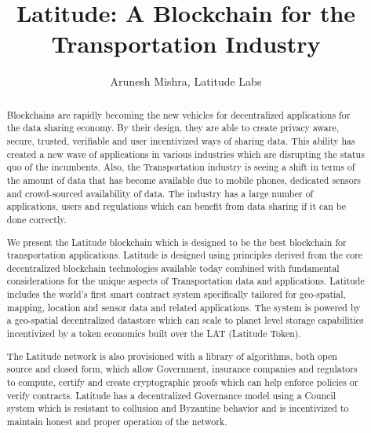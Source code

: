 \documentclass[preprint,10pt]{elsarticle}
\theoremstyle{definition}
\begin{document}
\begin{frontmatter}


\title{\textsf{Latitude: A Blockchain for the Transportation Industry}}

\author{Arunesh Mishra, Latitude Labs}
\address{Silicon Valley, California}

\begin{abstract}

Blockchains are rapidly becoming the new vehicles for decentralized applications for the data sharing economy. By their
    design, they are able to create privacy aware, secure, trusted, verifiable and user incentivized ways of sharing
    data. This ability has created a new wave of applications in various industries which are disrupting the status quo
    of the incumbents. Also, the Transportation industry is seeing a shift in terms of the amount of data that has
    become available due to mobile phones, dedicated sensors and crowd-sourced availability of data. The industry has a
    large number of applications, users and regulations which can benefit from data sharing if it can be done correctly.

 We present the Latitude blockchain which is designed to be the best blockchain for transportation applications.
    Latitude is designed using principles derived from the core decentralized blockchain technologies available today
    combined with fundamental considerations for the unique aspects of Transportation data and applications. Latitude
    includes the world's first smart contract system specifically tailored for geo-spatial, mapping, location and sensor
    data and related applications. The system is powered by a geo-spatial decentralized datastore which can scale to
    planet level storage capabilities incentivized by a token economics built over the LAT (Latitude Token).

    The Latitude network is also provisioned with a library of algorithms, both open source and closed form, which allow
    Government, insurance companies and regulators to compute, certify and create cryptographic proofs which can help enforce policies
    or verify contracts.  Latitude has a decentralized Governance model using a Council system which is resistant to
    collusion and Byzantine behavior and is incentivized to maintain honest and proper operation of the network.


\end{abstract}
\end{frontmatter}
\end{document}
